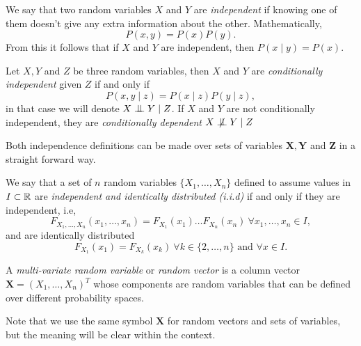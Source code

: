 \begin{definition}
We say that two random variables \(X\) and \(Y\) are \emph{independent} if knowing one of them doesn't give any extra information about the other. Mathematically,
\[
P(x,y) = P(x)P(y).
\]
From this it follows that if \(X\) and \(Y\) are independent, then \(P(x\mid y) = P(x)\).
\end{definition}


\begin{definition}
Let \(X,Y\) and \(Z\) be three random variables, then \(X\) and \(Y\) are
\emph{conditionally independent} given \(Z\) if and only if
\[
P(x,y \mid  z) = P(x\mid z)P(y\mid z),
\]
in that case we will denote \(X \bigCI Y \mid Z\). If \(X\) and \(Y\) are not
conditionally independent, they are \emph{conditionally dependent} \(X \bigCD Y \mid Z\)

\end{definition}

Both independence definitions can be made over sets of variables \(\bm{X},
\bm{Y}\) and \(\bm{Z}\) in a straight forward way.


\begin{definition}
  We say that a set of \(n\) random variables \(\{X_1,\dots,X_n\}\) defined to
  assume values in \(I \subset \mathbb{R}\) are
  \emph{independent and identically distributed (i.i.d)}
  if and only if they are independent, i.e,
  \[
    F_{X_1,\dots,X_n}(x_1,\dots,x_n) = F_{X_1}(x_1)\dots F_{X_n}(x_n) \ \forall
    x_1,\dots,x_n \in I,
  \]
  and are identically distributed
  \[
    F_{X_1}(x_1) = F_{X_k}(x_k) \ \forall k \in \{2,\dots,n\} \text{ and } \forall x
    \in I.
  \]


\end{definition}


\begin{definition}
  A \emph{multi-variate random variable} or \emph{random vector} is a column vector \(\bm{X} =
  (X_1,\dots,X_n)^T\) whose components are random variables that can be defined
  over different probability spaces.

  Note that we use the same symbol \(\bm{X}\) for random vectors and sets of
  variables, but the meaning will be clear within the context.
\end{definition}
